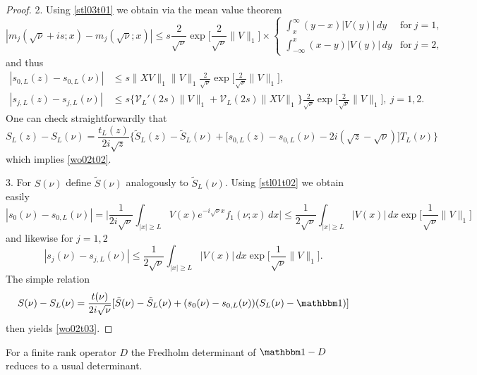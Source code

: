 \begin{proof}
2.
Using \eqref{stl03t01} we obtain via the mean value theorem
\begin{equation*}
  |m_j(\sqrt{\nu}+is;x) - m_j(\sqrt{\nu};x)| 
    \leq s \frac{2}{\sqrt{\nu}} \exp\big[ \frac{2}{\sqrt{\nu}} \|V\|_1\big] \times
\begin{cases}
   \int_x^\infty (y-x)|V(y)|\, dy & \text{for}\ j=1 , \\
   \int_{-\infty}^x (x-y)|V(y)|\, dy & \text{for}\ j=2 ,
\end{cases}
\end{equation*}
and thus
\begin{align*}
  |s_{0,L}(z) - s_{0,L}(\nu)|
     & \leq s \|XV\|_1\|V\|_1 \frac{2}{\sqrt{\nu}}\exp\big[ \frac{2}{\sqrt{\nu}}\|V\|_1\big] , \\
  |s_{j,L}(z) - s_{j,L}(\nu)| 
     & \leq s \Big\{ \mathcal{V}_L'(2s)\|V\|_1 + \mathcal{V}_L(2s)\|XV\|_1\Big\} \frac{2}{\sqrt{\nu}}\exp\big[\frac{2}{\sqrt{\nu}}\|V\|_1\big] ,\
        j=1,2.
\end{align*}
One can check straightforwardly that
\begin{equation*}
  S_L(z) - S_L(\nu)
    = \frac{t_L(z)}{2i\sqrt{z}}
        \Big\{ \tilde S_L(z) - \tilde S_L(\nu) + \big[ s_{0,L}(z)-s_{0,L}(\nu) - 2i(\sqrt{z}-\sqrt{\nu})\big] T_L(\nu) \Big\}
\end{equation*}
which implies \eqref{wo02t02}.

3.
For $S(\nu)$ define $\tilde S(\nu)$ analogously to $\tilde S_L(\nu)$.
Using  \eqref{stl01t02} we obtain easily
\begin{equation*}
   |s_0(\nu) - s_{0,L}(\nu)|
     = \Big|\frac{1}{2i\sqrt{\nu}} \int_{|x|\geq L} V(x) e^{-i\sqrt{\nu}x}f_1(\nu;x)\, dx\Big|
     \leq \frac{1}{2\sqrt{\nu}} \int_{|x|\geq L} |V(x)| \, dx \exp\big[ \frac{1}{\sqrt{\nu}} \|V\|_1\big]
\end{equation*}
and likewise for $j=1,2$
\begin{equation*}
  |s_j(\nu) - s_{j,L}(\nu)|
     \leq \frac{1}{2\sqrt{\nu}} \int_{|x|\geq L} |V(x)| \, dx \exp\big[ \frac{1}{\sqrt{\nu}} \|V\|_1\big] .
\end{equation*}
The simple relation
\begin{equation*}
  S(\nu) - S_L(\nu)
    = \frac{t(\nu)}{2i\sqrt{\nu}}[ \tilde S(\nu) - \tilde S_L(\nu) + (s_0(\nu)-s_{0,L}(\nu))(S_L(\nu)-\id) ]
\end{equation*}
then yields \eqref{wo02t03}.
\end{proof}

For a finite rank operator $D$ the Fredholm determinant of $\id-D$ reduces to a usual determinant.

